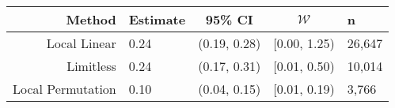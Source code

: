 \begin{tabular}{rlccl}
  \hline
Method & Estimate & 95\% CI & $\mathcal{W}$ & n \\ 
  \hline
Local Linear & 0.24 & (0.19, 0.28) & [0.00, 1.25) & 26,647 \\ 
  Limitless & 0.24 & (0.17, 0.31) & [0.01, 0.50) & 10,014 \\ 
  Local Permutation & 0.10 & (0.04, 0.15) & [0.01, 0.19) & 3,766 \\ 
   \hline
\end{tabular}
